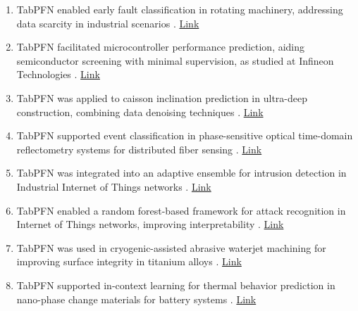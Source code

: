 \begin{enumerate}
\item TabPFN enabled early fault classification in rotating machinery, addressing data scarcity in industrial scenarios \cite{manuf_usecase1_rotating_faults_tabpfn}. \href{https://ieeexplore.ieee.org/abstract/document/10318062}{Link}

\item TabPFN facilitated microcontroller performance prediction, aiding semiconductor screening with minimal supervision, as studied at Infineon Technologies \cite{manuf_usecase2_mcu_performance_tabpfn}. \href{https://iris.polito.it/handle/11583/3002056}{Link}

\item TabPFN was applied to caisson inclination prediction in ultra-deep construction, combining data denoising techniques \cite{manuf_usecase3_caisson_inclination_ml}. \href{https://www.sciencedirect.com/science/article/abs/pii/S2214391225001734}{Link}

\item TabPFN supported event classification in phase-sensitive optical time-domain reflectometry systems for distributed fiber sensing \cite{manuf_usecase4_photdr_event_classification}. \href{https://opg.optica.org/oe/fulltext.cfm?uri=oe-33-17-36646&id=575783}{Link}

\item TabPFN was integrated into an adaptive ensemble for intrusion detection in Industrial Internet of Things networks \cite{ruizvillafranca2024tabpfnbased}. \href{https://rdcu.be/eASzJ}{Link}

\item TabPFN enabled a random forest-based framework for attack recognition in Internet of Things networks, improving interpretability \cite{manuf_usecase6_rf_tabpfn_iot_attack}. \href{https://ieeexplore.ieee.org/stamp/stamp.jsp?tp=&arnumber=11142329}{Link}

\item TabPFN was used in cryogenic-assisted abrasive waterjet machining for improving surface integrity in titanium alloys \cite{manuf_usecase8_cryo_awj_ti64}. \href{https://www.sciencedirect.com/science/article/abs/pii/S2214993725004531}{Link}

\item TabPFN supported in-context learning for thermal behavior prediction in nano-phase change materials for battery systems \cite{manuf_usecase9_nano_pcm_thermal_icl}. \href{https://www.sciencedirect.com/science/article/pii/S036054422504335X}{Link}


\end{enumerate}

